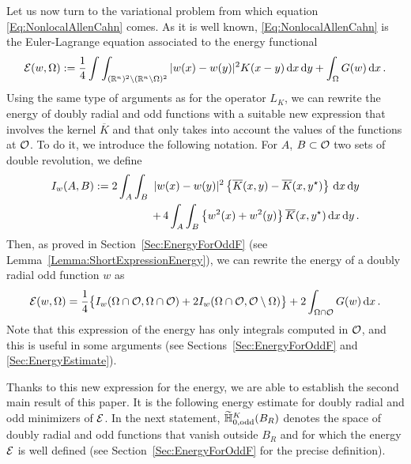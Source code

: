 Let us now turn to the variational problem from which equation \eqref{Eq:NonlocalAllenCahn} comes. As it is well known, \eqref{Eq:NonlocalAllenCahn} is the Euler-Lagrange equation associated to the energy functional
\begin{equation}
\label{Eq:Energy}
\mathcal{E}(w, \Omega) := \dfrac{1}{4}\int\int_{(\mathbb{R}^{n})^2 \setminus (\mathbb{R}^n\setminus\Omega)^2} |w(x) - w(y)|^2 K(x-y) \,\mathrm{d} x \,\mathrm{d} y + \int_{\Omega} G(w) \,\mathrm{d} x \,.
\end{equation}
Using the same type of arguments as for the operator $L_K$, we can rewrite the energy of doubly radial and odd functions with a suitable new expression that involves the kernel $\overline{K}$ and that only takes into account the values of the functions at $\mathcal{O}$. To do it, we introduce the following notation.  For $A$, $B\subset \mathcal{O}$ two sets of double revolution, we define
\begin{equation*}
\begin{split}
I_w(A,B) := 2\int_A  \int_B  \ |w(x)-w(y)|^2 \left\{ \overline{K}(x,y) - \overline{K}(x,y^\star) \right\} \,\mathrm{d} x \,\mathrm{d} y  \\
+\, 4 \int_A  \int_B  \left\{w^2(x)+w^2(y)\right\} \overline{K}(x,y^\star) \,\mathrm{d} x \,\mathrm{d} y\,.
\end{split}
\end{equation*}
Then, as proved in Section~\ref{Sec:EnergyForOddF} (see Lemma~\ref{Lemma:ShortExpressionEnergy}), we can rewrite the energy of a doubly radial odd function $w$ as
\begin{equation}
\label{Eq:ShortExpressionEnergyIntro}
\mathcal{E}(w, \Omega) = \frac{1}{4} \big \{I_w(\Omega\cap\mathcal{O},\Omega\cap\mathcal{O}) +  2I_w(\Omega\cap\mathcal{O},\mathcal{O}\setminus\Omega) \big \} + 2\int_{\Omega\cap \mathcal{O}} G(w) \,\mathrm{d} x \,.
\end{equation}
Note that this expression of the energy has only integrals computed in $\mathcal{O}$, and this is useful in some arguments (see Sections~\ref{Sec:EnergyForOddF} and \ref{Sec:EnergyEstimate}). 


Thanks to this new expression for the energy, we are able to establish the second main result of this paper. It is the following energy estimate for doubly radial and odd minimizers of $\mathcal{E}$. In the next statement, $\widetilde{\mathbb{H}}^K_{0, \mathrm{odd}}(B_R)$ denotes the space of doubly radial and odd functions that vanish outside $B_R$ and for which the energy $\mathcal{E}$ is well defined (see Section~\ref{Sec:EnergyForOddF} for the precise definition).


